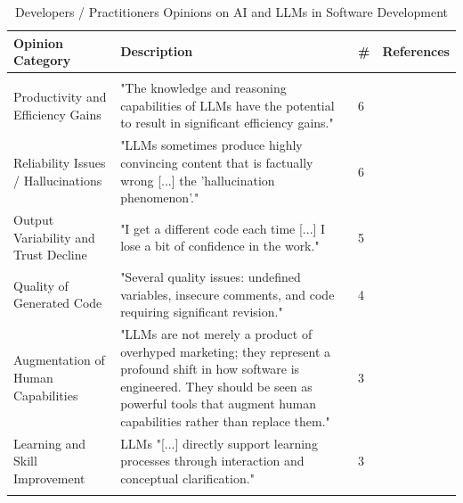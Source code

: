 {\small
\begin{longtable}{>{\raggedright\arraybackslash}p{3.2cm} p{8.8cm}  p{0.2cm} p{1.8cm}}
\caption{Developers / Practitioners Opinions on AI and LLMs in Software Development}
\label{tab:stakeholder_opinions_devs} \\

\toprule
\textbf{Opinion Category} & \textbf{Description} & \textbf{\#} & \textbf{References} \\
\midrule
\endfirsthead

\midrule
\multicolumn{4}{r}{\textit{Continued on next page}}\\
\bottomrule
\endfoot

\bottomrule
\endlastfoot

Productivity and Efficiency Gains & 
"The knowledge and reasoning capabilities of LLMs have the potential to result in significant efficiency gains." \cite{Banh:2025cf} & 6 & \cite{Banh:2025cf, Basha:2025tt, Terragni:2025fa, Haque:2025la, Zamfiroiu:2025ec, Han:2025mg} \\ \addlinespace
Reliability Issues / Hallucinations & "LLMs sometimes produce highly convincing content that is factually wrong [...] the 'hallucination phenomenon'." \cite{Bai:2025ci} & 6 & \cite{Bai:2025ci, Jabrw:2025ss, Durrani:2024ad, Basha:2025tt, Banh:2025cf, Pendyala:2025pi} \\ \addlinespace
Output Variability and Trust Decline & "I get a different code each time [...] I lose a bit of confidence in the work." \cite{Banh:2025cf} & 5 & \cite{Banh:2025cf, Basha:2025tt, Pendyala:2025pi, Ramos:2025aa, Terragni:2025fa} \\ \addlinespace
Quality of Generated Code & "Several quality issues: undefined variables, insecure comments, and code requiring significant revision." \cite{Jabrw:2025ss} & 4 & \cite{Terragni:2025fa, Jabrw:2025ss, Jensen:2025me, Zhang:2025ea} \\ \addlinespace
Augmentation of Human Capabilities & "LLMs are not merely a product of overhyped marketing; they represent a profound shift in how software is engineered. They should be seen as powerful tools that augment human capabilities rather than replace them." \cite{Haque:2025la} & 3 & \cite{Haque:2025la, Basha:2025tt, Terragni:2025fa} \\ \addlinespace
Learning and Skill Improvement & LLMs "[...] directly support learning processes through interaction and conceptual clarification." \cite{Zamfiroiu:2025ec} & 3 & \cite{Gao:2025cc, Zamfiroiu:2025ec, Haque:2025la} \\ \addlinespace

\end{longtable}}

